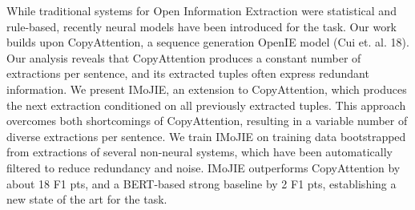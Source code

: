 While traditional systems for Open Information Extraction were statistical and rule-based, recently neural models have been introduced for the task. Our work builds upon CopyAttention, a sequence generation OpenIE model (Cui et. al. 18). Our analysis reveals that CopyAttention produces a constant number of extractions per sentence, and its extracted tuples often express redundant information. We present IMoJIE, an extension to CopyAttention, which produces the next extraction conditioned on all previously extracted tuples. This approach overcomes both shortcomings of CopyAttention, resulting in a variable number of diverse extractions per sentence. We train IMoJIE on training data bootstrapped from extractions of several non-neural systems, which have been automatically filtered to reduce redundancy and noise. IMoJIE outperforms CopyAttention by about 18 F1 pts, and a BERT-based strong baseline by 2 F1 pts, establishing a new state of the art for the task.
